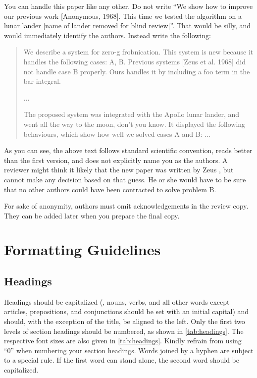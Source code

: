 \documentclass[runningheads]{eccv/llncs}
\begin{document}
You can handle this paper like any other.
Do not write ``We show how to improve our previous work [Anonymous, 1968].
This time we tested the algorithm on a lunar lander [name of lander removed for blind review]''.
That would be silly, and would immediately identify the authors.
Instead write the following:
\begin{quotation}
   We describe a system for zero-g frobnication.
   This system is new because it handles the following cases:
   A, B.  Previous systems [Zeus et al. 1968] did not  handle case B properly.
   Ours handles it by including a foo term in the bar integral.

   ...

   The proposed system was integrated with the Apollo lunar lander, and went all the way to the moon, don't you know.
   It displayed the following behaviours, which show how well we solved cases A and B: ...
\end{quotation}
As you can see, the above text follows standard scientific convention, reads better than the first version, and does not explicitly name you as the authors.
A reviewer might think it likely that the new paper was written by Zeus \etal, but cannot make any decision based on that guess.
He or she would have to be sure that no other authors could have been contracted to solve problem B.

For sake of anonymity, authors must omit acknowledgements in the review copy. 
They can be added later when you prepare the final copy.


\section{Formatting Guidelines}

\subsection{Headings}
Headings should be capitalized (\ie, nouns, verbs, and all other words except articles, prepositions, and conjunctions should be set with an initial capital) and should, with the exception of the title, be aligned to the left.
Only the first two levels of section headings should be numbered, as shown in \cref{tab:headings}.
The respective font sizes are also given in \cref{tab:headings}. 
Kindly refrain from using ``0'' when numbering your section headings.
Words joined by a hyphen are subject to a special rule. 
If the first word can stand alone, the second word should be capitalized.
\end{document}
